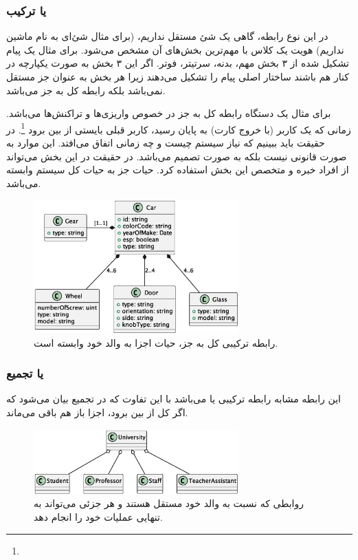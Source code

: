 \subsubsection{ یا ترکیب}

در این نوع رابطه، گاهی یک شئ مستقل نداریم، (برای مثال شئ‌ای به نام ماشین نداریم)
هویت یک کلاس با مهم‌ترین بخش‌های آن مشخص می‌شود. برای مثال یک پیام تشکیل شده از
۳ بخش مهم، بدنه، سرتیتر، فوتر. اگر این ۳ بخش به صورت یکپارچه در کنار هم باشند
ساختار اصلی پیام را تشکیل می‌دهند زیرا هر بخش به عنوان جز مستقل نمی‌باشد بلکه
رابطه کل به جز می‌باشد.

برای مثال  یک دستگاه  رابطه کل به جز در خصوص واریزی‌ها و
تراکنش‌ها می‌باشد. زمانی که  یک کاربر (با خروج کارت) به پایان رسید،
 کاربر قبلی بایستی از بین برود \footnote{}. در حقیقت
باید ببینیم که نیاز سیستم چیست و چه زمانی اتفاق می‌افتد. این موارد به صورت
قانونی نیست بلکه به صورت تصمیم می‌باشد. در حقیقت در این بخش می‌تواند از افراد
خبره و متخصص این بخش استفاده کرد. حیات جز به حیات کل سیستم وابسته می‌باشد.

\begin{figure}[H]
    \centering
    \includegraphics[width=0.7\textwidth]{assets/classes/firstComposition.eps}
    \caption{رابطه ترکیبی کل به جز، حیات اجزا به والد خود وابسته است.}
\end{figure}

\subsubsection{ یا تجمیع}

این رابطه مشابه رابطه ترکیبی یا  می‌باشد با این تفاوت که در
تجمیع بیان می‌شود که اگر کل از بین برود، اجزا باز هم باقی می‌ماند.

\begin{figure}[H]
    \centering
    \includegraphics[width=0.7\textwidth]{assets/classes/firstAggregation.eps}
    \caption{روابطی که نسبت به والد خود مستقل هستند و هر جزئی می‌تواند به تنهایی
    عملیات خود را انجام دهد.}
\end{figure}


